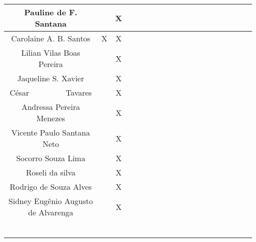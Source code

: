 \documentclass[12pt]{report}
\begin{document}
\begin{landscape}
\begin{table}[!htbp]
\begin{tabular}{|*{19}{c|}}
 Pauline de F. Santana              &  &X &  &  &  &  &  &  &  &  &  &  &  &  &  &  &  &  \\ \hline
 Carolaine A. B. Santos             &X &X &  &  &  &  &  &  &  &  &  &  &  &  &  &  &  &  \\ \hline
 Lilian Vilas Boas Pereira          &  &X &  &  &  &  &  &  &  &  &  &  &  &  &  &  &  &  \\ \hline
 Jaqueline S. Xavier                &  &X &  &  &  &  &  &  &  &  &  &  &  &  &  &  &  &  \\ \hline
 César$~~~~~~~~~~~~~~~~~~~~~$Tavares&  &X &  &  &  &  &  &  &  &  &  &  &  &  &  &  &  &  \\ \hline
 Andressa Pereira Menezes           &  &X &  &  &  &  &  &  &  &  &  &  &  &  &  &  &  &  \\ \hline
 Vicente Paulo Santana Neto         &  &X &  &  &  &  &  &  &  &  &  &  &  &  &  &  &  &  \\ \hline
 Socorro Souza Lima                 &  &X &  &  &  &  &  &  &  &  &  &  &  &  &  &  &  &  \\ \hline
 Roseli da silva                    &  &X &  &  &  &  &  &  &  &  &  &  &  &  &  &  &  &  \\ \hline
 Rodrigo de Souza Alves             &  &X &  &  &  &  &  &  &  &  &  &  &  &  &  &  &  &  \\ \hline
 Sidney Eugênio Augusto de Alvarenga&  &X &  &  &  &  &  &  &  &  &  &  &  &  &  &  &  &  \\ \hline

 &  &  &  &  &  &  &  &  &  &  &  &  &  &  &  &  &  &  \\ \hline
 &  &  &  &  &  &  &  &  &  &  &  &  &  &  &  &  &  &  \\ \hline
 &  &  &  &  &  &  &  &  &  &  &  &  &  &  &  &  &  &  \\ \hline
 &  &  &  &  &  &  &  &  &  &  &  &  &  &  &  &  &  &  \\ \hline
 &  &  &  &  &  &  &  &  &  &  &  &  &  &  &  &  &  &  \\ \hline
 &  &  &  &  &  &  &  &  &  &  &  &  &  &  &  &  &  &  \\ \hline

 \hline
\end{tabular}
\label{actividades}
\end{table}
\end{landscape}
\end{document}
